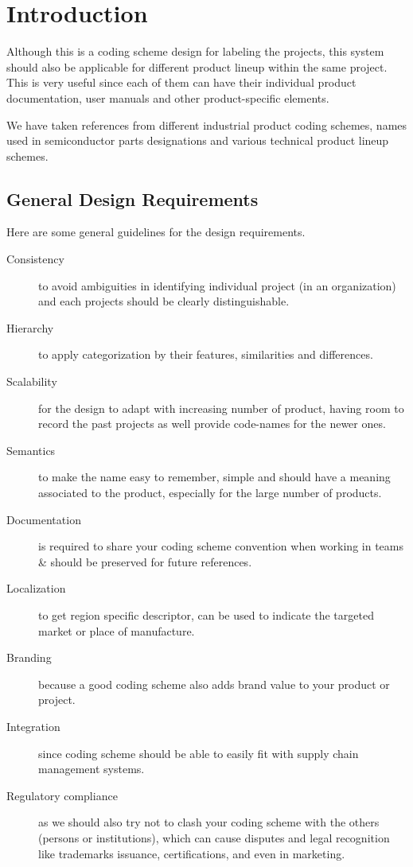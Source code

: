 %
%
\chapter{Introduction}

Although this is a coding scheme design for labeling the projects, this system should also be applicable for different product lineup within the same project. This is very useful since each of them can have their individual product documentation, user manuals and other product-specific elements.

We have taken references from different industrial product coding schemes, names used in semiconductor parts designations and various technical product lineup schemes. \cite{thomas2016developing}

\section{General Design Requirements}

Here are some general guidelines for the design requirements.

\begin{description}
    \item[Consistency] to avoid ambiguities in identifying individual project (in an organization) and each projects should be clearly distinguishable.
    \item[Hierarchy] to apply categorization by their features, similarities and differences.
    \item[Scalability] for the design to adapt with increasing number of product, having room to record the past projects as well  provide code-names for the newer ones.
    \item[Semantics] to make the name easy to remember, simple and should have a meaning associated to the product, especially for the large number of products. \cite{Kohoeo2023Thesis}
    \item[Documentation] is required to share your coding scheme convention when working in teams \& should be preserved for future references.
    \item[Localization] to get region specific descriptor, can be used to indicate the targeted market or place of manufacture.
   \item[Branding] because a good coding scheme also adds brand value to your product or project.
    \item[Integration] since coding scheme should be able to easily fit with supply chain management systems.
    \item[Regulatory compliance] as we should also try not to clash your coding scheme with the others (persons or institutions), which can cause disputes and legal recognition like trademarks issuance, certifications, and even in marketing.
\end{description}

